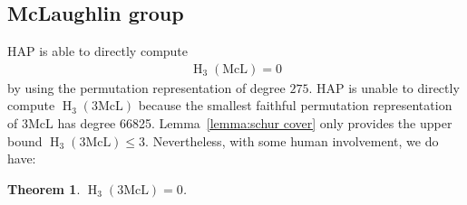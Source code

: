 \documentclass[pdftex]{sigma}
\numberwithin{equation}{section}
\newtheorem{Theorem}{Theorem}[section]
\DeclareMathOperator\homology{H}
\renewcommand\H{\homology}
\newcommand\<\langle
\renewcommand\>\rangle
\begin{document}
\subsection{McLaughlin group} \label{sec:McL}

HAP is able to directly compute
\begin{gather*} \H_3(\mathrm{McL}) = 0 \end{gather*}
 by using the permutation representation of degree $275$. HAP is unable to directly compute $\H_3(3\mathrm{McL})$ because the smallest faithful permutation representation of $3\mathrm{McL}$ has degree 66825. Lemma~\ref{lemma:schur cover} only provides the upper bound $\H_3(3\mathrm{McL}) \leq 3$.
Nevertheless, with some human involvement, we do have:

\begin{Theorem} \label{thm.mcl}
 $\H_3(3\mathrm{McL}) = 0$.
\end{Theorem}
\end{document}
